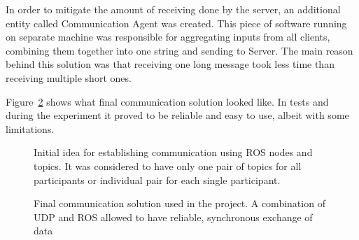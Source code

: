 \documentclass[11pt,english,twoside]{article}
\begin{document}
\par
In order to mitigate the amount of receiving done by the server, an additional entity called Communication Agent was created. This piece of software running on separate machine was responsible for aggregating inputs from all clients, combining them together into one string and sending to Server. The main reason behind this solution was that receiving one long message took less time than receiving multiple short ones. 
\par
Figure~\ref{fig:ros_final} shows what final communication solution looked like. In tests and during the experiment it proved to be reliable and easy to use, albeit with some limitations.

\begin{figure}[!] 
\caption{Initial idea for establishing communication using ROS nodes and topics. It was considered to have only one pair of topics for all participants or individual pair for each single participant.}
\label{fig:ros_initial_idea}
\end{figure} 


\begin{figure}[!] 
\caption{Final communication solution used in the project. A combination of UDP and ROS allowed to have reliable, synchronous exchange of data}
\label{fig:ros_final}
\end{figure} 
\end{document}
